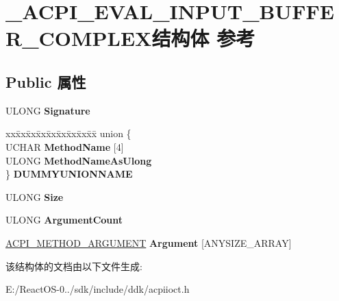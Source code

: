 \hypertarget{struct___a_c_p_i___e_v_a_l___i_n_p_u_t___b_u_f_f_e_r___c_o_m_p_l_e_x}{}\section{\+\_\+\+A\+C\+P\+I\+\_\+\+E\+V\+A\+L\+\_\+\+I\+N\+P\+U\+T\+\_\+\+B\+U\+F\+F\+E\+R\+\_\+\+C\+O\+M\+P\+L\+E\+X结构体 参考}
\label{struct___a_c_p_i___e_v_a_l___i_n_p_u_t___b_u_f_f_e_r___c_o_m_p_l_e_x}
\subsection*{Public 属性}
\begin{DoxyCompactItemize}
\item 
\mbox{\label{struct___a_c_p_i___e_v_a_l___i_n_p_u_t___b_u_f_f_e_r___c_o_m_p_l_e_x_a939066d1858dc380715b8a52bbfb9b77}} 
U\+L\+O\+NG {\bfseries Signature}
\item 
\mbox{\label{struct___a_c_p_i___e_v_a_l___i_n_p_u_t___b_u_f_f_e_r___c_o_m_p_l_e_x_aaaa0237e2af917b3d9b16efd4acbec17}} 
\begin{tabbing}
xx\=xx\=xx\=xx\=xx\=xx\=xx\=xx\=xx\=\kill
union \{\\
\>UCHAR {\bfseries MethodName} \mbox{[}4\mbox{]}\\
\>ULONG {\bfseries MethodNameAsUlong}\\
\} {\bfseries DUMMYUNIONNAME}\\

\end{tabbing}\item 
\mbox{\label{struct___a_c_p_i___e_v_a_l___i_n_p_u_t___b_u_f_f_e_r___c_o_m_p_l_e_x_aacfcc62be291c1d3b6e57e11338039d2}} 
U\+L\+O\+NG {\bfseries Size}
\item 
\mbox{\label{struct___a_c_p_i___e_v_a_l___i_n_p_u_t___b_u_f_f_e_r___c_o_m_p_l_e_x_af3439c01d675a7ed77feb943ccfc0d64}} 
U\+L\+O\+NG {\bfseries Argument\+Count}
\item 
\mbox{\label{struct___a_c_p_i___e_v_a_l___i_n_p_u_t___b_u_f_f_e_r___c_o_m_p_l_e_x_a5b4123948892f559fa2b1503ace68bc7}} 
\hyperlink{struct___a_c_p_i___m_e_t_h_o_d___a_r_g_u_m_e_n_t}{A\+C\+P\+I\+\_\+\+M\+E\+T\+H\+O\+D\+\_\+\+A\+R\+G\+U\+M\+E\+NT} {\bfseries Argument} \mbox{[}A\+N\+Y\+S\+I\+Z\+E\+\_\+\+A\+R\+R\+AY\mbox{]}
\end{DoxyCompactItemize}


该结构体的文档由以下文件生成\+:\begin{DoxyCompactItemize}
\item 
E\+:/\+React\+O\+S-\/0../sdk/include/ddk/acpiioct.\+h\end{DoxyCompactItemize}
